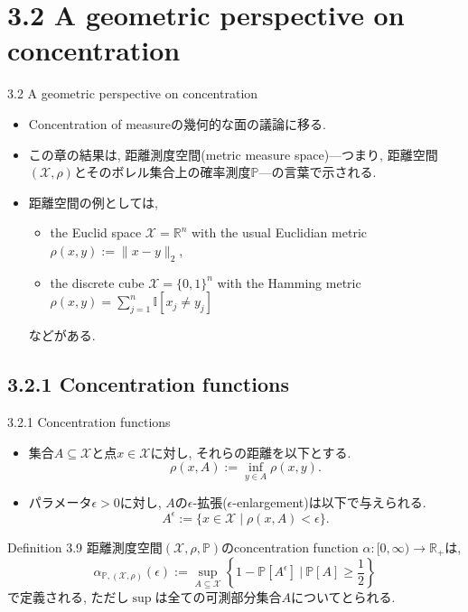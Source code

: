 \documentclass[aspectratio=169, dvipdfmx]{beamer}
\begin{document}
\section{3.2 A geometric perspective on concentration}

\begin{frame}{3.2 A geometric perspective on concentration}
\begin{itemize}
    \item Concentration of measureの幾何的な面の議論に移る.
    \item この章の結果は, 距離測度空間(metric measure space)---つまり, 距離空間$(\mathcal{X}, \rho)$とそのボレル集合上の確率測度$\mathbb{P}$---の言葉で示される.
    \item 距離空間の例としては, 
    \begin{itemize}
        \item the Euclid space $\mathcal{X} = \mathbb{R}^n$ with the usual Euclidian metric $\rho(x,y):=\|x-y\|_2$,
        \item the discrete cube $\mathcal{X} = \{0, 1\}^n$ with the Hamming metric $\rho(x,y)=\sum_{j=1}^n\mathbb{I}[x_j\ne y_j]$
    \end{itemize}
    などがある.
\end{itemize}
\end{frame}

\subsection{3.2.1 Concentration functions}
\begin{frame}{3.2.1 Concentration functions}
\begin{itemize}
    \item 集合$A\subseteq \mathcal{X}$と点$x\in \mathcal{X}$に対し, それらの距離を以下とする.
    \[ \rho(x, A) := \inf_{y \in A}\rho(x, y). \tag{3.26}\label{3.26}\]
    \item パラメータ$\epsilon > 0$に対し, $A$の$\epsilon$-拡張($\epsilon$-enlargement)は以下で与えられる.
    \[ A^\epsilon := \{ x \in \mathcal{X} \mid \rho(x, A) < \epsilon \}. \tag{3.27}\label{3.27} \]
\end{itemize}
\begin{block}{Definition 3.9}
    距離測度空間$(\mathcal{X}, \rho, \mathbb{P})$のconcentration function $\alpha:[0,\infty)\to\mathbb{R}_+$は,
    \[
        \alpha_{\mathbb{P}, (\mathcal{X}, \rho)}(\epsilon)
        := \sup_{A \subseteq \mathcal{X}}\left\{ 1-\mathbb{P}[A^\epsilon]\ \Big|\ \mathbb{P}[A] \ge \frac{1}{2} \right\}
        \tag{3.28}\label{3.28}
    \]
    で定義される, ただし$\sup$は全ての可測部分集合$A$についてとられる.
\end{block}
\end{frame}
\end{document}
